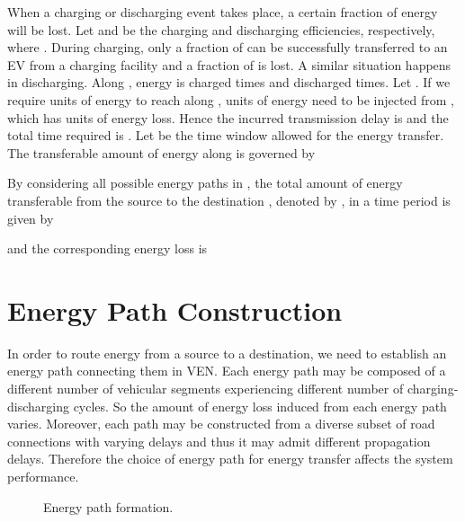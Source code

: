 \documentclass[journal]{IEEEtran}
\begin{document}
When a charging or discharging event takes place, a certain fraction of energy will be lost. Let  and  be the charging and discharging efficiencies, respectively, where . During charging, only a fraction of  can be successfully transferred to an EV from a charging facility and a fraction of  is lost. A similar situation happens in discharging. Along , energy is charged  times  and discharged  times. Let . If we require  units of energy to reach  along ,  units of energy need to be injected from , which has  units of energy loss. Hence the incurred transmission delay is  and the total time required is . Let  be the time window allowed for the energy transfer. The transferable amount of energy along  is governed by

 By considering all possible energy paths in , the total amount of energy transferable from the source  to the destination , denoted by , in a time period  is given by

and the corresponding energy loss is







\section{Energy Path Construction} \label{sec:wholeset}

In order to route energy from a source to a destination, we need to establish an energy path connecting them  in VEN. Each energy path may be composed of a different number of vehicular segments experiencing different number of charging-discharging cycles.  So the amount of energy loss induced from each energy path varies. Moreover, each path may be constructed from a diverse subset of road connections with varying delays and thus it may admit different propagation delays. Therefore the choice of energy path for energy transfer affects the system performance.




\begin{figure}[!t]
	\begin{center}
	\end{center}
	\caption{Energy path formation.}
  \label{fig:routeformation}
\end{figure}
\end{document}
